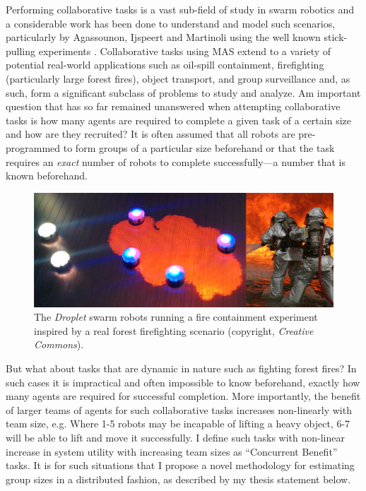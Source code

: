 \documentclass[11pt, onecolumn, compsoc, letterpaper]{article}
\begin{document}
Performing collaborative tasks is a vast sub-field of study in swarm robotics and a considerable work has been done to understand and model such scenarios, particularly by Agassounon, Ijspeert and Martinoli using the well known stick-pulling experiments \cite{Martinoli1995, Martinoli1999b, Agassounon2001, Ijspeert2001, Agassounon2002}. Collaborative tasks using MAS extend to a variety of potential real-world applications such as oil-spill containment, firefighting (particularly large forest fires), object transport, and group surveillance and, as such, form a significant subclass of problems to study and analyze. Am important question that has so far remained unanswered when attempting collaborative tasks is how many agents are required to complete a given task of a certain size and how are they recruited? It is often assumed that all robots are pre-programmed to form groups of a particular size beforehand or that the task requires an \emph{exact} number of robots to complete successfully---a number that is known beforehand. 

\begin{figure}[!tb]
	\centering\includegraphics[width=\textwidth]{../assets/dropletfire.png}
	\centering\caption{The \emph{Droplet} swarm robots running a fire containment experiment inspired by a real forest firefighting scenario (copyright, \emph{Creative Commons}).}\label{fig:dropletfire}
\end{figure}

But what about tasks that are dynamic in nature such as fighting forest fires? In such cases it is impractical and often impossible to know beforehand, exactly how many agents are required for successful completion. More importantly, the benefit of larger teams of agents for such collaborative tasks increases non-linearly with team size, e.g. Where 1-5 robots may be incapable of lifting a heavy object, 6-7 will be able to lift and move it successfully. I define such tasks with non-linear increase in system utility with increasing team sizes as ``Concurrent Benefit'' tasks. It is for such situations that I propose a novel methodology for estimating group sizes in a distributed fashion, as described by my thesis statement below.
\end{document}
